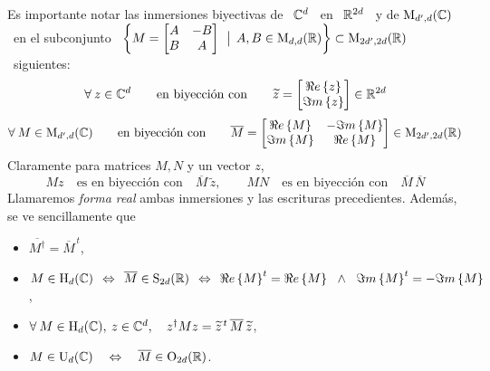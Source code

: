 Es importante notar  las inmersiones biyectivas de \ $\mathbb{C}^d$  \ en \ $\mathbb{R}^{2
  d}$  \   y  de  $\mathrm{M}_{d',d}(\mathbb{C})$  \   en  el  subconjunto   \  $\left\{  M
  =  \begin{bmatrix}  A   &  -  B  \\   B  &  A  \end{bmatrix}  \:\: \big| \:\:   A,  B  \in
  \mathrm{M}_{d,d}(\mathbb{R}) \right\} \subset \mathrm{M}_{2 d', 2d}(\mathbb{R})$ \ siguientes:
%
\[
\forall \: z  \in \mathbb{C}^d \qquad \mbox{en biyecci\'on  con} \qquad \widetilde{z}
= \begin{bmatrix} \Re e \left\{ z \right\}\\ \Im m \left\{ z \right\} \end{bmatrix} \in \mathbb{R}^{2 d}
\]
%
\[
\forall  \:  M \in  \mathrm{M}_{d',d}(\mathbb{C})  \qquad  \mbox{en  biyecci\'on con}  \qquad
\overline{M}   =   \begin{bmatrix}   \Re e \left\{ M \right\}   &  -   \Im m \left\{ M \right\}\\   \Im m \left\{ M \right\}   &
  \Re e \left\{ M \right\} \end{bmatrix} \in \mathrm{M}_{2d',2d}(\mathbb{R})
\]
%
Claramente para matrices $M, N$ y un vector $z$,
%
\[
M z \quad \mbox{es en biyecci\'on con} \quad \overline{M} \, \widetilde{z}, \qquad
M N \quad \mbox{es en biyecci\'on con} \quad \overline{M} \, \overline{N}
\]
%
Llamaremos   {\em    forma   real}   ambas   inmersiones    y   las   escrituras
precedientes. Adem\'as, se ve sencillamente que
%
\begin{itemize}
\item  $\displaystyle   \overline{M^\dag}  =  \overline{M}^{\,   t}$,
%
\item $\displaystyle M \in  \mathrm{H}_d(\mathbb{C}) \:\: \Leftrightarrow \:\: \overline{M}
  \in \mathrm{S}_{2d}(\mathbb{R}) \:\: \Leftrightarrow \:\: \Re e \left\{ M \right\}^t = \Re e \left\{ M \right\} \, \:\: \wedge \:\: \,
  \Im m \left\{ M \right\}^t = - \Im m \left\{ M \right\}$,
%
\item $\forall  \: M \in  \mathrm{H}_d(\mathbb{C}), \:  z \in \mathbb{C}^d,  \quad z^\dag M  z =
  \widetilde{z}^{\, t} \, \overline{M} \, \widetilde{z}$,
%
\item  $M  \in  \mathrm{U}_d(\mathbb{C})  \quad  \Leftrightarrow  \quad  \overline{M}  \in
  \mathrm{O}_{2d}(\mathbb{R})$.
\end{itemize}
%

